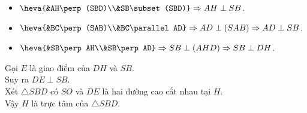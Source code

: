 \begin{bt}
{\begin{enumerate}
\begin{itemize}
	$\Rightarrow AH\perp (SBD)$ hay $H$ là hình chiếu của $A$ lên mặt phẳng $(SBD)$.
	\item $\heva{&AH\perp(SBD)\\&SB\subset(SBD)}\Rightarrow AH\perp SB$.\\
	\item $\heva{&BC\perp (SAB)\\&BC\parallel AD}\Rightarrow AD\perp (SAB) \Rightarrow AD\perp SB$.
	\item $\heva{&SB\perp AH\\&SB\perp AD}\Rightarrow SB\perp (AHD)\Rightarrow SB\perp DH$.
	\end{itemize}
	Gọi $E$ là giao điểm của $DH$ và $SB$.\\
	Suy ra $DE\perp SB$.\\
	Xét $\triangle SBD$ có $SO$ và $DE$ là hai đường cao cắt nhau tại $H$.\\
	Vậy $H$ là trực tâm của $\triangle SBD$.
	\end{enumerate}

	}
\end{bt}

